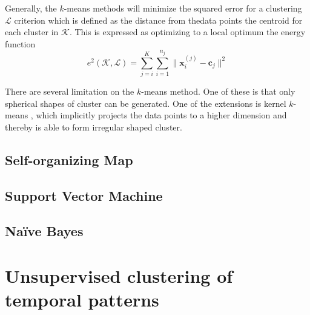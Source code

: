 Generally, the $k$-means methods will minimize the squared error for a clustering $\mathcal{L}$ criterion which is defined as the distance from thedata points the centroid for each cluster in $\mathcal{K}$.
This is expressed as optimizing to a local optimum the energy function
\begin{equation}
	\label{eq:k-means energy}
	e^2(\mathcal{K},\mathcal{L}) =
	\sum_{j=i}^{K}\sum_{i=1}^{n_j}\|\mathbf{x}_i^{(j)} -
	\mathbf{c}_j\|^2
\end{equation}

There are several limitation on the $k$-means method.
One of these is that only spherical shapes of cluster can be generated.
One of the extensions is kernel $k$-means \cite{scholkopf1998nonlinear}, which implicitly projects the data points to a higher dimension and thereby is able to form irregular shaped cluster.

\subsection{Self-organizing Map}

\subsection{Support Vector Machine}

\subsection{Na\"{i}ve Bayes}

\section{Unsupervised clustering of temporal patterns}